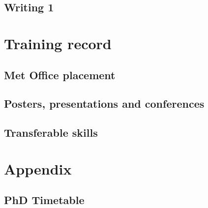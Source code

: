 \documentclass[11pt,a4paper]{article}
\begin{document}
\subsection{Writing 1}
\label{sec:Writing 1}

\section{Training record}
\label{sec:Training record}

\subsection{Met Office placement}
\label{sec:Met Office placement}

\subsection{Posters, presentations and conferences}
\label{sec:presentations}

\subsection{Transferable skills}
\label{sec:Transferable skills}

\printbibliography[title={References}]

\newpage
\section*{Appendix}

\subsection*{PhD Timetable}
\end{document}
